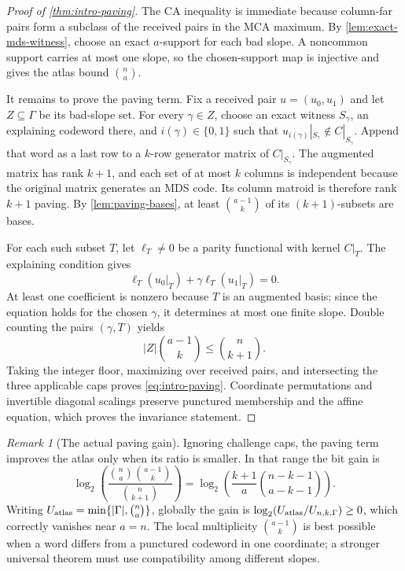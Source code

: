 \documentclass[11pt,a4paper]{amsart}
\numberwithin{equation}{section}
\theoremstyle{remark}
\newtheorem{remark}[remark]{Remark}
\newcommand{\abs}[1]{\lvert #1\rvert}
\begin{document}
\begin{proof}[Proof of \cref{thm:intro-paving}]
The CA inequality is immediate because column-far pairs form a subclass
of the received pairs in the MCA maximum.  By
\cref{lem:exact-mds-witness}, choose an exact \(a\)-support for each bad
slope.  A noncommon support carries at most one slope, so the chosen-support
map is injective and gives the atlas bound \(\binom na\).

It remains to prove the paving term.  Fix a received pair \(u=(u_0,u_1)\)
and let \(Z\subseteq\Gamma\) be its bad-slope set.  For every
\(\gamma\in Z\), choose an exact witness \(S_\gamma\), an explaining
codeword there, and \(i(\gamma)\in\{0,1\}\) such that
\(u_{i(\gamma)}|_{S_\gamma}\notin C|_{S_\gamma}\).
Append that word as a last row to a \(k\)-row generator matrix of
\(C|_{S_\gamma}\).  The augmented matrix has rank \(k+1\), and each set
of at most \(k\) columns is independent because the original matrix
generates an MDS code.  Its column matroid is therefore rank \(k+1\)
paving.  By \cref{lem:paving-bases}, at least \(\binom{a-1}k\) of its
\((k+1)\)-subsets are bases.

For each such subset \(T\), let \(\ell_T\ne0\) be a parity functional
with kernel \(C|_T\).  The explaining condition gives
\[
 \ell_T(u_0|_T)+\gamma\ell_T(u_1|_T)=0.            \tag{2.4}
 \label{eq:paving-affine-equation}
\]
At least one coefficient is nonzero because \(T\) is an augmented basis;
since the equation holds for the chosen \(\gamma\), it determines at most
one finite slope.  Double counting the pairs \((\gamma,T)\) yields
\[
 \abs Z\binom{a-1}k\le\binom n{k+1}.
\]
Taking the integer floor, maximizing over received pairs, and intersecting
the three applicable caps proves \eqref{eq:intro-paving}.  Coordinate
permutations and invertible diagonal scalings preserve punctured
membership and the affine equation, which proves the invariance statement.
\end{proof}

\begin{remark}[The actual paving gain]\label{rem:paving-saving}
Ignoring challenge caps, the paving term improves the atlas only when its
ratio is smaller.  In that range the bit gain is
\[
 \log_2\!\left(
 \frac{\binom na\binom{a-1}k}{\binom n{k+1}}\right)
 =\log_2\!\left(\frac{k+1}{a}
                 \binom{n-k-1}{a-k-1}\right).     \tag{2.5}
\]
Writing \(U_{\rm atlas}=\min\{\abs\Gamma,\binom na\}\), globally the gain is
\(\log_2(U_{\rm atlas}/U_{n,k,\Gamma})\ge0\), which correctly vanishes
near \(a=n\).  The local multiplicity \(\binom{a-1}k\) is best possible
when a word differs from a punctured codeword in one coordinate; a
stronger universal theorem must use compatibility among different slopes.
\end{remark}
\end{document}
